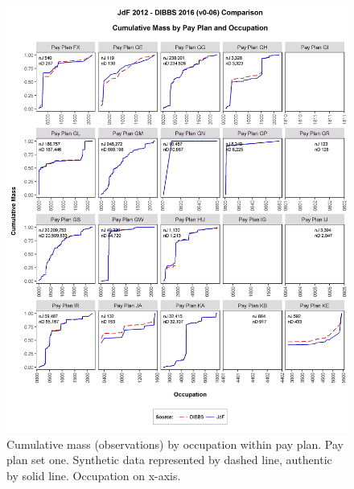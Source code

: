 \documentclass[10pt, letterpaper]{article}
\begin{document}
\begin{spacing}{1.0}
\begin{figure}[h!]
    \centering
    \includegraphics[width=5.85in, trim={0 0.75in 0 0.75in}, clip]{CMFOccupationPayPlan61.png}
    \caption{Cumulative mass (observations) by occupation within pay plan.  Pay plan set one.  Synthetic data represented by dashed line, authentic by solid line.  Occupation on x-axis.}
    \label{figure:CMFOccupationPayPlan1}
\end{figure}

\clearpage


\end{spacing}
\end{document}
